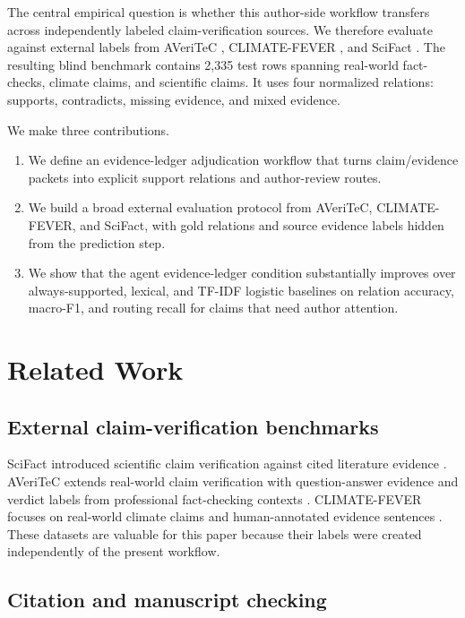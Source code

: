 \documentclass[11pt]{article}
\begin{document}
The central empirical question is whether this author-side workflow transfers across independently labeled claim-verification sources. We therefore evaluate against external labels from AVeriTeC \citep{Schlichtkrull2023AVeriTeC}, CLIMATE-FEVER \citep{Diggelmann2020ClimateFever}, and SciFact \citep{Wadden2020Fact}. The resulting blind benchmark contains 2,335 test rows spanning real-world fact-checks, climate claims, and scientific claims. It uses four normalized relations: supports, contradicts, missing evidence, and mixed evidence.

We make three contributions.

\begin{enumerate}
  \item We define an evidence-ledger adjudication workflow that turns claim/evidence packets into explicit support relations and author-review routes.
  \item We build a broad external evaluation protocol from AVeriTeC, CLIMATE-FEVER, and SciFact, with gold relations and source evidence labels hidden from the prediction step.
  \item We show that the agent evidence-ledger condition substantially improves over always-supported, lexical, and TF-IDF logistic baselines on relation accuracy, macro-F1, and routing recall for claims that need author attention.
\end{enumerate}

\section{Related Work}

\subsection{External claim-verification benchmarks}

SciFact introduced scientific claim verification against cited literature evidence \citep{Wadden2020Fact}. AVeriTeC extends real-world claim verification with question-answer evidence and verdict labels from professional fact-checking contexts \citep{Schlichtkrull2023AVeriTeC}. CLIMATE-FEVER focuses on real-world climate claims and human-annotated evidence sentences \citep{Diggelmann2020ClimateFever}. These datasets are valuable for this paper because their labels were created independently of the present workflow.

\subsection{Citation and manuscript checking}
\end{document}
